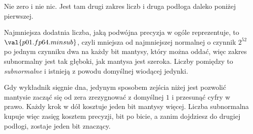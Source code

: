 \begin{fr}
\begin{ansblock}
Nie zero i nie nic. Jest tam drugi zakres liczb i druga podłoga daleko poniżej
pierwszej.
\end{ansblock}

Najmniejsza dodatnia liczba, jaką podwójna precyzja w ogóle reprezentuje, to
$\val{p01.fp64.minsub}$, czyli mniejsza od najmniejszej normalnej o czynnik
$2^{52}$ \dash{} po jednym czynniku dwa na każdy bit mantysy, który można
oddać, więc zakres subnormalny jest tak głęboki, jak mantysa jest szeroka.
Liczby pomiędzy to \emph{subnormalne} i istnieją z powodu
domyślnej wiodącej jedynki.

Gdy wykładnik sięgnie dna, jedynym sposobem zejścia niżej jest pozwolić
mantysie zacząć się od zera \dash{} zrezygnować z domyślnej $1$ i przesunąć
cyfry w prawo. Każdy krok w dół kosztuje jeden bit mantysy więcej. Liczba
subnormalna kupuje więc zasięg kosztem precyzji, bit po bicie, a zanim
dojdziesz do drugiej podłogi, zostaje jeden bit znaczący.
\end{fr}


